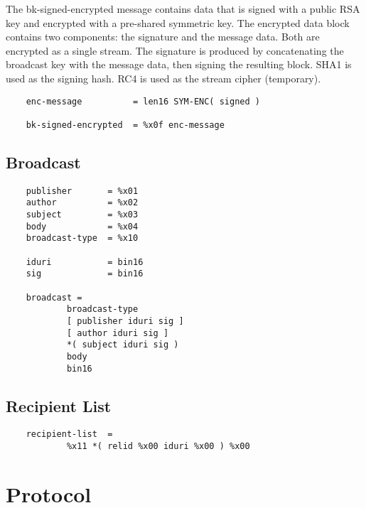 \documentclass[letterpaper,11pt,oneside]{article}
\begin{document}
The bk-signed-encrypted message contains data that is signed with a public RSA
key and encrypted with a pre-shared symmetric key. The encrypted data block
contains two components: the signature and the message data. Both are encrypted
as a single stream. The signature is produced by concatenating the broadcast
key with the message data, then signing the resulting block. SHA1 is used as
the signing hash. RC4 is used as the stream cipher (temporary).

\vspace{10pt}
\begin{verbatim}
    enc-message          = len16 SYM-ENC( signed ) 

    bk-signed-encrypted  = %x0f enc-message
\end{verbatim}
\vspace{10pt}

\subsection{Broadcast}

\vspace{10pt}
\begin{verbatim}
    publisher       = %x01
    author          = %x02
    subject         = %x03
    body            = %x04
    broadcast-type  = %x10

    iduri           = bin16
    sig             = bin16 

    broadcast =
            broadcast-type
            [ publisher iduri sig ]
            [ author iduri sig ]
            *( subject iduri sig )
            body 
            bin16 
\end{verbatim}
\vspace{10pt}

\subsection{Recipient List}

\vspace{10pt}
\begin{verbatim}
    recipient-list  = 
            %x11 *( relid %x00 iduri %x00 ) %x00
\end{verbatim}
\vspace{10pt}


%
%

\section{Protocol}
\end{document}
